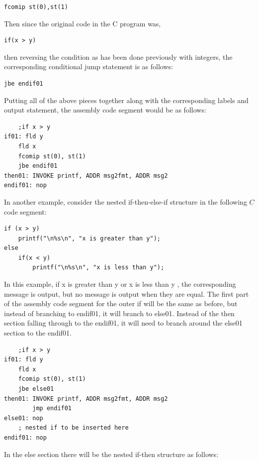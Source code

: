\documentclass[10pt]{book}
\begin{document}
\begin{verbatim}
fcomip st(0),st(1)
\end{verbatim}

Then since the original code in the C program was,

\begin{verbatim}
if(x > y)
\end{verbatim}

then reversing the condition as has been done previously with integers, the corresponding conditional jump statement is as follows:

\begin{verbatim}
jbe endif01
\end{verbatim}

Putting all of the above pieces together along with the corresponding labels and output statement, the assembly code segment would be as follows:

\begin{verbatim}
    ;if x > y
if01: fld y
    fld x
    fcomip st(0), st(1)
    jbe endif01
then01: INVOKE printf, ADDR msg2fmt, ADDR msg2
endif01: nop
\end{verbatim}

In another example, consider the nested if-then-else-if structure in the following $C$ code segment:

\begin{verbatim}
if (x > y)
    printf("\n%s\n", "x is greater than y");
else
    if(x < y)
        printf("\n%s\n", "x is less than y");
\end{verbatim}

In this example, if x is greater than y or x is less than y , the corresponding message is output, but no message is output when they are equal. The first part of the assembly code segment for the outer if will be the same as before, but instead of branching to endif01, it will branch to else01. Instead of the then section falling through to the endif01, it will need to branch around the else01 section to the endif01.

\begin{verbatim}
    ;if x > y
if01: fld y
    fld x
    fcomip st(0), st(1)
    jbe else01
then01: INVOKE printf, ADDR msg2fmt, ADDR msg2
        jmp endif01
else01: nop
    ; nested if to be inserted here
endif01: nop
\end{verbatim}

In the else section there will be the nested if-then structure as follows:
\end{document}
